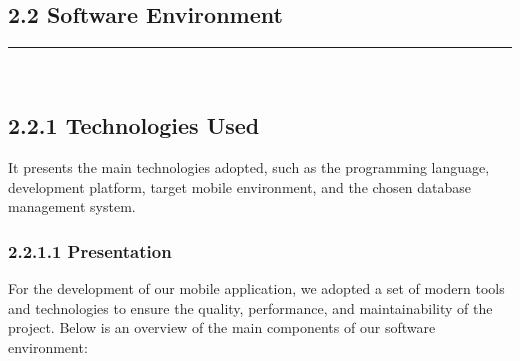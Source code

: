 \documentclass[12pt]{report}
\begin{document}
\subsection*{2.2 Software Environment}
\vspace{-0.3cm}
\rule{0.40\linewidth}{0.5pt} \\[-1.2cm]
\subsection*{2.2.1 Technologies Used}
It presents the main technologies adopted, such as the programming language, development platform, target mobile environment, and the chosen database management system.

\subsubsection*{2.2.1.1 Presentation}
For the development of our mobile application, we adopted a set of modern tools and technologies to ensure the quality, performance, and maintainability of the project. Below is an overview of the main components of our software environment:
\end{document}
